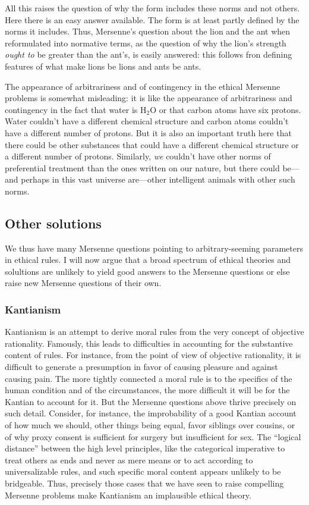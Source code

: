 All this raises the question of why the form includes these norms and not others. Here there is an easy 
answer available. The form is at least partly defined by the norms it includes. Thus, Mersenne's question about the lion and
the ant when reformulated into normative terms, as the question of why the lion's strength \textit{ought to} be greater
than the ant's, is easily answered: this follows fron defining features of what make lions be lions and ants be ants. 

The appearance of arbitrariness and of contingency in the ethical Mersenne problems is somewhat misleading: it is like the appearance of arbitrariness and
contingency in the fact that water is H$_2$O or that carbon atoms have six protons. Water couldn't have a different chemical
structure and carbon atoms couldn't have a different number of protons. But it is also an important truth  here that there 
could be other substances that could have a different chemical structure or a different number of protons. Similarly, \textit{we}
couldn't have other norms of preferential treatment than the ones written on our nature, but there could be---and perhaps in
this vast universe are---other intelligent animals with other such norms.

\subsection{Other solutions}
We thus have many Mersenne questions pointing to arbitrary-seeming parameters in ethical rules.
I will now argue that a broad spectrum of ethical theories and solultions are unlikely to yield good answers to the Mersenne questions
or else raise new Mersenne questions of their own.

\subsubsection{Kantianism}
Kantianism is an attempt to derive moral rules from the very concept of objective rationality. Famously, this leads to difficulties in
accounting for the substantive content of rules. For instance, from the point of view of objective rationality, it is difficult
to generate a presumption in favor of causing pleasure and against causing pain. The more tightly connected a moral rule is to the
specifics of the human condition and of the circumstances, the more difficult it will be for the Kantian to account for it. But the Mersenne questions above
thrive precisely on such detail. Consider, for instance, the improbability of a good Kantian account of how much we 
should, other things being equal, favor siblings over cousins, or of why proxy consent is sufficient for surgery but insufficient for
sex. The ``logical distance'' between the high level principles, like the categorical imperative to treat others as ends and never
as mere means or to act according to universalizable rules, and such specific moral content appears unlikely to be bridgeable.
Thus, precisely those cases that we have seen to raise compelling Mersenne problems make Kantianism an implausible ethical theory.


